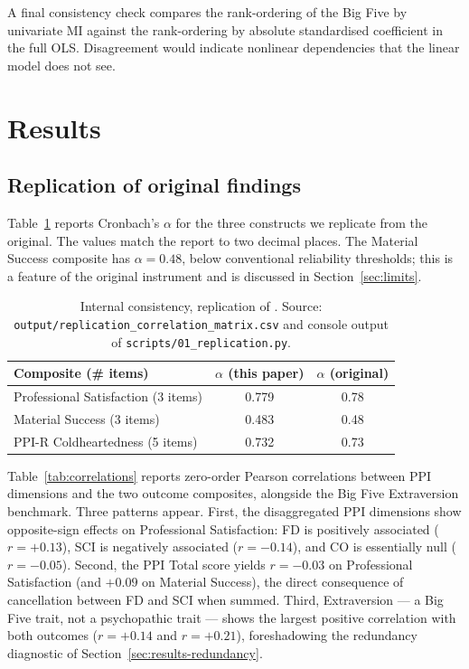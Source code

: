 \documentclass[11pt,a4paper]{article}
\begin{document}
A final consistency check compares the rank-ordering of the Big Five
by univariate MI against the rank-ordering by absolute standardised
coefficient in the full OLS. Disagreement would indicate nonlinear
dependencies that the linear model does not see.

\section{Results}
\label{sec:results}

\subsection{Replication of original findings}
\label{sec:results-replication}

Table~\ref{tab:reliability} reports Cronbach's $\alpha$ for the three
constructs we replicate from the original. The values match the
\citet{eisenbarth2018} report to two decimal places. The Material
Success composite has $\alpha = 0.48$, below conventional reliability
thresholds; this is a feature of the original instrument and is
discussed in Section~\ref{sec:limits}.

\begin{table}[h!]
\centering
\caption{Internal consistency, replication of \citet{eisenbarth2018}.
Source: \texttt{output/replication\_correlation\_matrix.csv} and
console output of \texttt{scripts/01\_replication.py}.}
\label{tab:reliability}
\begin{tabular}{lcc}
\toprule
\textbf{Composite (\# items)} & $\alpha$ (this paper) & $\alpha$ (original) \\
\midrule
Professional Satisfaction (3 items) & 0.779 & 0.78 \\
Material Success (3 items)          & 0.483 & 0.48 \\
PPI-R Coldheartedness (5 items)     & 0.732 & 0.73 \\
\bottomrule
\end{tabular}
\end{table}

Table~\ref{tab:correlations} reports zero-order Pearson correlations
between PPI dimensions and the two outcome composites, alongside the
Big Five Extraversion benchmark. Three patterns appear. First, the
disaggregated PPI dimensions show opposite-sign effects on
Professional Satisfaction: FD is positively associated ($r=+0.13$),
SCI is negatively associated ($r=-0.14$), and CO is essentially
null ($r=-0.05$). Second, the PPI Total score yields $r=-0.03$ on
Professional Satisfaction (and $+0.09$ on Material Success), the
direct consequence of cancellation between FD and SCI when summed.
Third, Extraversion --- a Big Five trait, not a psychopathic trait
--- shows the largest positive correlation with both outcomes
($r=+0.14$ and $r=+0.21$), foreshadowing the redundancy diagnostic
of Section~\ref{sec:results-redundancy}.
\end{document}
